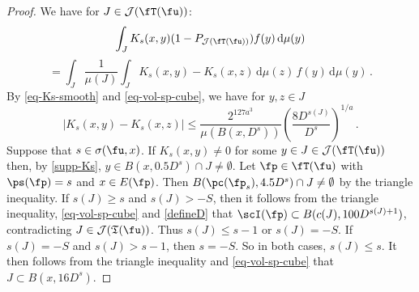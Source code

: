 \begin{proof}
    \leanok
    We have for $J \in \mathcal{J}(\fT(\fu))$:
    $$
        \int_J K_{s}(x,y)(1 - P_{\mathcal{J}(\fT(\fu))})f(y) \, \mathrm{d}\mu(y)
    $$
    \begin{equation}
    \label{eq-canc-comp}
        = \int_J \frac{1}{\mu(J)} \int_J K_s(x,y) - K_s(x,z) \, \mathrm{d}\mu(z) \,f(y) \, \mathrm{d}\mu(y)\,.
    \end{equation}
    By \eqref{eq-Ks-smooth} and \eqref{eq-vol-sp-cube}, we have for $y, z \in J$
    $$
        |K_s(x,y) - K_s(x,z)| \le \frac{2^{127a^3}}{\mu(B(x, D^s))} \left(\frac{8 D^{s(J)}}{D^s}\right)^{1/a}\,.
    $$
    Suppose that $s \in \sigma(\fu, x)$.
    If $K_s(x,y) \ne 0$ for some $y \in J \in \mathcal{J}(\fT(\fu))$ then, by \eqref{supp-Ks}, $y \in B(x, 0.5 D^s) \cap J \ne \emptyset$. Let $\fp \in \fT(\fu)$ with $\ps(\fp) = s$ and $x \in E(\fp)$. Then $B(\pc(\fp_s), 4.5D^s) \cap J \ne \emptyset$ by the triangle inequality. If $s(J) \ge s$ and $s(J) > -S$, then it follows from the triangle inequality, \eqref{eq-vol-sp-cube} and \eqref{defineD} that $\scI(\fp) \subset B(c(J), 100 D^{s(J)+1})$, contradicting $J \in \mathcal{J}(\mathfrak{T}(\fu))$. Thus $s(J) \le s - 1$ or $s(J) = -S$. If $s(J) = -S$ and $s(J) > s - 1$, then $s = -S$. So in both cases, $s(J) \le s$. It then follows from the triangle inequality and \eqref{eq-vol-sp-cube} that $J \subset B(x, 16 D^s)$.


\end{proof}
